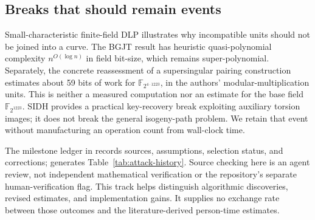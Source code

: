 \subsection{Breaks that should remain events}
Small-characteristic finite-field DLP illustrates why incompatible units should not be joined into a curve. The BGJT result has heuristic quasi-polynomial complexity $n^{O(\log n)}$ in field bit-size, which remains super-polynomial.\cite{bgjthistory} Separately, the concrete reassessment of a supersingular pairing construction estimates about 59 bits of work for $\mathbb F_{2^{4\cdot1223}}$, in the authors' modular-multiplication units. This is neither a measured computation nor an estimate for the base field $\mathbb F_{2^{1223}}$.\cite{gkzhistory} SIDH provides a practical key-recovery break exploiting auxiliary torsion images; it does not break the general isogeny-path problem.\cite{sidhhistory} We retain that event without manufacturing an operation count from wall-clock time.

The milestone ledger in  records sources, assumptions, selection status, and corrections;  generates Table~\ref{tab:attack-history}. Source checking here is an agent review, not independent mathematical verification or the repository's separate human-verification flag. This track helps distinguish algorithmic discoveries, revised estimates, and implementation gains. It supplies no exchange rate between those outcomes and the literature-derived person-time estimates.
